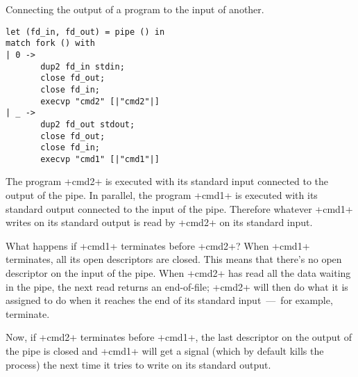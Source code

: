 \begin{example} Connecting the output of a program to the input of another.
%
\begin{lstlisting}
let (fd_in, fd_out) = pipe () in
match fork () with
| 0 -> 
       dup2 fd_in stdin;
       close fd_out;
       close fd_in;
       execvp "cmd2" [|"cmd2"|]
| _ -> 
       dup2 fd_out stdout;
       close fd_out;
       close fd_in;
       execvp "cmd1" [|"cmd1"|]
\end{lstlisting}
%
The program \ml+cmd2+ is executed with its standard input connected to
the output of the pipe. In parallel, the program \ml+cmd1+ is executed
with its standard output connected to the input of the pipe. Therefore
whatever \ml+cmd1+ writes on its standard output is read by \ml+cmd2+
on its standard input.

What happens if \ml+cmd1+ terminates before \ml+cmd2+? When \ml+cmd1+
terminates, all its open descriptors are closed.  This means that there's no
open descriptor on the input of the pipe. When \ml+cmd2+ has read all
the data waiting in the pipe, the next read returns an end-of-file;
\ml+cmd2+ will then do what it is assigned to do when it reaches the
end of its standard input~---~for example, terminate. 


Now,  if \ml+cmd2+ terminates before \ml+cmd1+, the last descriptor on
the output of the pipe is closed and \ml+cmd1+ will get
a signal (which by default kills the process) the next time
it tries to write on its standard output. 


\end{example}

